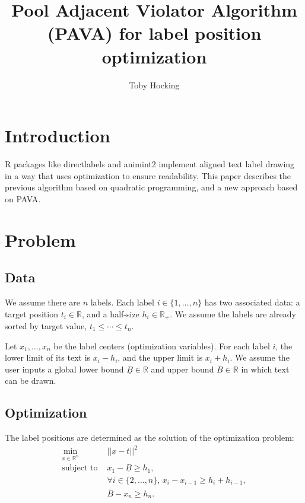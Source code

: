 \documentclass[12pt]{article}
\begin{document}
\author{Toby Hocking}

\title{Pool Adjacent Violator Algorithm (PAVA) for label position optimization}

\maketitle

\section{Introduction}

R packages like directlabels and animint2 implement aligned text label drawing in a way that uses optimization to ensure readability.
This paper describes the previous algorithm based on quadratic programming, and a new approach based on PAVA.

\section{Problem}

\subsection{Data}

We assume there are $n$ labels.
Each label $i\in\{1,\dots,n\}$ has two associated data: a target position $t_i\in\mathbb R$, and a half-size $h_i\in\mathbb R_+$.
We assume the labels are already sorted by target value, $t_1\leq\cdots\leq t_n$.

Let $x_1,\dots,x_n$ be the label centers (optimization variables).
For each label $i$, the lower limit of its text is $x_i-h_i$, and the upper limit is $x_i+h_i$.
We assume the user inputs a global lower bound $\underline B\in\mathbb R$ and upper bound $\overline B\in\mathbb R$ in which text can be drawn.

\subsection{Optimization}

The label positions are determined as the solution of the optimization problem:
\begin{equation}
    \label{eq:label-pos}
\begin{aligned}
  \min_{x\in\mathbb R^n} & ||x-t||^2 \\
  \text{subject to }& x_1 - \underline B\geq h_1 ,\\
                    & \forall i\in\{2, \dots, n\},\, x_i-x_{i-1} \geq h_i + h_{i-1},\\
   & \overline B-x_n\geq h_n .
\end{aligned}
\end{equation}
\end{document}
